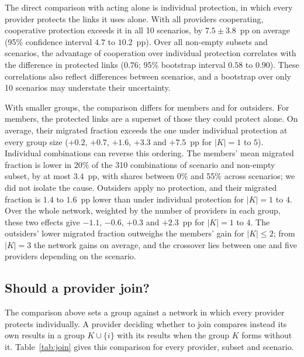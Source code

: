 \documentclass[11pt,a4paper]{article}
\theoremstyle{definition}
\begin{document}
The direct comparison with acting alone is individual protection, in which every provider protects the links it uses alone.
With all providers cooperating, cooperative protection exceeds it in all 10 scenarios, by $7.5\pm3.8$~pp on average (95\% confidence interval $4.7$ to $10.2$~pp).
Over all non-empty subsets and scenarios, the advantage of cooperation over individual protection correlates with the difference in protected links ($0.76$; 95\% bootstrap interval $0.58$ to $0.90$).
These correlations also reflect differences between scenarios, and a bootstrap over only 10 scenarios may understate their uncertainty.

With smaller groups, the comparison differs for members and for outsiders.
For members, the protected links are a superset of those they could protect alone.
On average, their migrated fraction exceeds the one under individual protection at every group size ($+0.2$, $+0.7$, $+1.6$, $+3.3$ and $+7.5$~pp for $|K|=1$ to $5$).
Individual combinations can reverse this ordering. The members' mean migrated fraction is lower in 20\% of the 310 combinations of scenario and non-empty subset, by at most $3.4$~pp, with shares between 0\% and 55\% across scenarios; we did not isolate the cause.
Outsiders apply no protection, and their migrated fraction is $1.4$ to $1.6$~pp lower than under individual protection for $|K|=1$ to $4$.
Over the whole network, weighted by the number of providers in each group, these two effects give $-1.1$, $-0.6$, $+0.3$ and $+2.3$~pp for $|K|=1$ to $4$.
The outsiders' lower migrated fraction outweighs the members' gain for $|K|\le 2$; from $|K|=3$ the network gains on average, and the crossover lies between one and five providers depending on the scenario.

\subsection{Should a provider join?}

The comparison above sets a group against a network in which every provider protects individually.
A provider deciding whether to join compares instead its own results in a group $K\cup\{i\}$ with its results when the group $K$ forms without it.
Table~\ref{tab:join} gives this comparison for every provider, subset and scenario.
\end{document}
